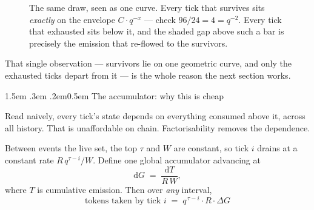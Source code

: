 \documentclass[11pt]{article}
\makeatletter
\renewcommand\section{\@startsection{section}{1}{\z@}%
  {1.5em \@plus .3em \@minus .2em}{0.5em}%
  {\sffamily\large\bfseries\color{accent}}}
\makeatother
\begin{document}
\begin{figure}[h]
\centering
{}
\caption{The same draw, seen as one curve. Every tick that survives sits \emph{exactly} on the
envelope $C\cdot q^{-x}$ — check $96/24 = 4 = q^{-2}$. Every tick that exhausted sits below it,
and the shaded gap above such a bar is precisely the emission that re-flowed to the survivors.}
\end{figure}

That single observation — survivors lie on one geometric curve, and only the exhausted ticks
depart from it — is the whole reason the next section works.

\section{The accumulator: why this is cheap}
\label{sec:acc}

Read naively, every tick's state depends on everything consumed above it, across all history.
That is unaffordable on chain. Factorisability removes the dependence.

Between events the live set, the top $\tau$ and $W$ are constant, so tick $i$ drains at a
constant rate $R\,q^{\tau-i}/W$. Define one global accumulator advancing at
\[
  \mathrm{d}G \;=\; \frac{\mathrm{d}T}{R\,W},
\]
where $T$ is cumulative emission. Then over \emph{any} interval,
\[
  \boxed{\;\text{tokens taken by tick } i \;=\; q^{\,\tau-i}\cdot R\cdot \Delta G\;}
\]
\end{document}
